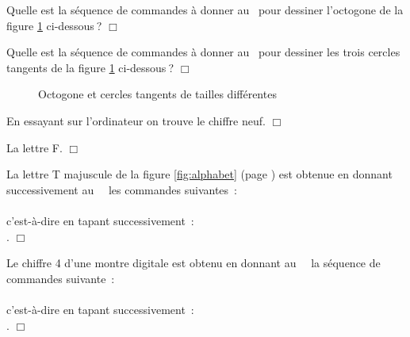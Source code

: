 \begin{exercice}{
Quelle est la séquence de commandes à donner au \robot\ pour
dessiner l'octogone de la figure \ref{fig:octogone-cercles} 
\hbox{ci-dessous$\:$?}
$\Box$}\end{exercice}

\begin{exercice}{
Quelle est la séquence de commandes à donner au \robot\ pour
dessiner les trois cercles tangents de la figure \ref{fig:octogone-cercles} 
\hbox{ci-dessous$\:$?}
$\Box$}\end{exercice}

\begin{figure}[htbp]
 \caption{Octogone et cercles tangents de tailles différentes}
 \label{fig:octogone-cercles}
\end{figure}

\begin{corrige}{
En essayant sur l'ordinateur on trouve le chiffre neuf.
$\Box$}\end{corrige}

\begin{corrige}{
La lettre F.
$\Box$}\end{corrige}

\begin{corrige}{
La lettre T majuscule de la figure \ref{fig:alphabet} (page \pageref{fig:alphabet}) est
obtenue en donnant successivement au \robot\ \robotCbN\ les commandes suivantes~:\\
\hspace*{2ex}{\idt av$;$ av$;$ av$;$ av$;$ pqtd$;$ av$;$ pqtd$;$ pqtd$;$ av$;$ av$;$}\\
c'est-à-dire en tapant \hbox{successivement~:}\\
\hspace*{2ex}    \touche{$+$}  \touche{$+$} \touche{$+$} 
 .
$\Box$}\end{corrige}

\begin{corrige}{
Le chiffre 4 d'une montre digitale est
obtenu en donnant au \robot\ \robotCbN\ la séquence de commandes suivante~:\\
\hspace*{2ex}{\idt av$;$ av$;$ pqtd$;$ pqtd$;$ av$;$ pqtd$;$ av$;$ pqtd$;$ av$;$}\\
c'est-à-dire en tapant \hbox{successivement~:}\\
\hspace*{2ex}  \touche{$+$} \touche{$+$}  \touche{$+$}  \touche{$+$} .
$\Box$}\end{corrige}

